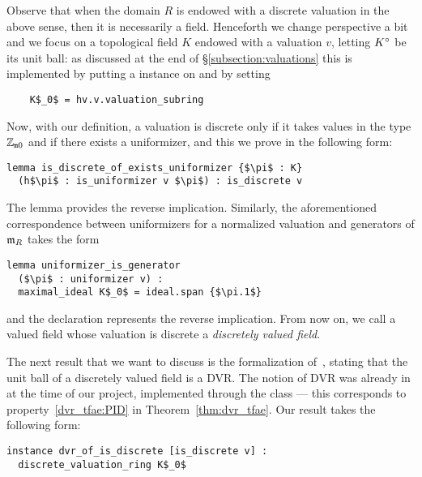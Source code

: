 \documentclass[sigplan,screen]{acmart}
\begin{document}
Observe that when the domain $R$ is endowed with a discrete valuation in the above sense, then it is necessarily a field. Henceforth we change perspective a bit and we focus on a topological field $K$ endowed with a valuation $v$, letting ${K}^\circ$ be its unit ball: as discussed at the end of \S\ref{subsection:valuations} this is implemented by putting a  instance  on  and by setting 
\begin{lstlisting}
    K$_0$ = hv.v.valuation_subring
\end{lstlisting}

Now, with our definition, a valuation is discrete only if it takes values in the type $\mathbb{Z}_{\mathtt{m}0}$ and if there exists a uniformizer, and this we prove in the following form\href{https://github.com/mariainesdff/local_fields_journal/blob/7ac213eb804fe7945468023527a0fe26ab23b3c8/src/discrete_valuation_ring/basic.lean#L164}{\extlink}:
\begin{lstlisting}
lemma is_discrete_of_exists_uniformizer {$\pi$ : K} 
  (h$\pi$ : is_uniformizer v $\pi$) : is_discrete v
\end{lstlisting}
The lemma \href{https://github.com/mariainesdff/local_fields_journal/blob/7ac213eb804fe7945468023527a0fe26ab23b3c8/src/discrete_valuation_ring/basic.lean#L324}{\extlink} provides the reverse implication. Similarly, the aforementioned correspondence between uniformizers for a normalized valuation and generators of $\mathfrak{m}_{R}$ takes the form\href{https://github.com/mariainesdff/local_fields_journal/blob/7ac213eb804fe7945468023527a0fe26ab23b3c8/src/discrete_valuation_ring/basic.lean#L295}{\extlink}
\begin{lstlisting}
lemma uniformizer_is_generator 
  ($\pi$ : uniformizer v) :
  maximal_ideal K$_0$ = ideal.span {$\pi.1$}
\end{lstlisting}
and the declaration \href{https://github.com/mariainesdff/local_fields_journal/blob/7ac213eb804fe7945468023527a0fe26ab23b3c8/src/discrete_valuation_ring/basic.lean#L348}{\extlink} represents the reverse implication. From now on, we call a valued field whose valuation is discrete a \emph{discretely valued field}.

The next result that we want to discuss is the formalization of~\cite[Chapitre~I, \S1, Proposition~1]{Ser62}, stating that the unit ball of a discretely valued field is a DVR. The notion of DVR was already in \mathlib at the time of our project, implemented through the class \href{https://leanprover-community.github.io/mathlib_docs/ring_theory/discrete_valuation_ring/basic.html#discrete_valuation_ring}{\extlink} --- this corresponds to property~\ref{dvr_tfae:PID} in Theorem~\ref{thm:dvr_tfae}. Our result takes the following form\href{https://github.com/mariainesdff/local_fields_journal/blob/7ac213eb804fe7945468023527a0fe26ab23b3c8/src/discrete_valuation_ring/basic.lean#L438}{\extlink}:
\begin{lstlisting}[caption={The unit ball is a DVR if the valuation is discrete.}, label={code:serre_prop_1}]
instance dvr_of_is_discrete [is_discrete v] :
  discrete_valuation_ring K$_0$
\end{lstlisting}
\end{document}
